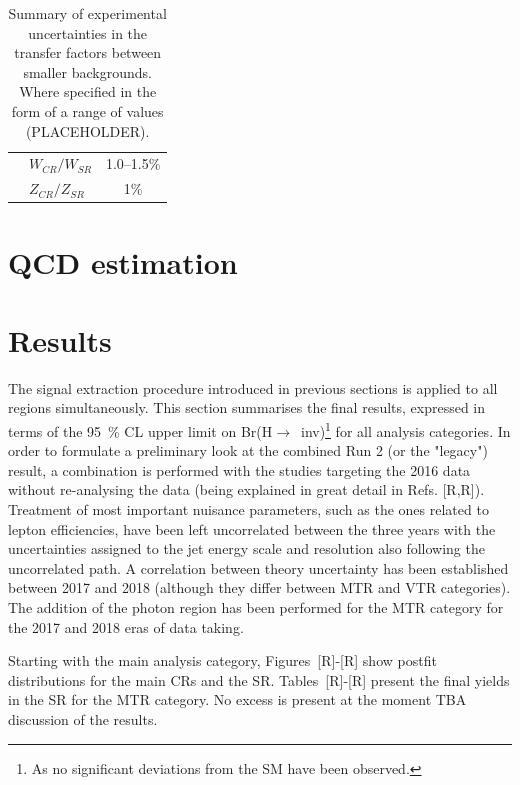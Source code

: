 \begin{table}[htbp]
\begin{center}
\begin{tabular}{llc}
                                & $W_{CR}/W_{SR}$               & 1.0--1.5\% \\
                                & $Z_{CR}/Z_{SR}$				& 1\% \\
       \hline
      \end{tabular}
    \end{center}
    \label{tab:systematics}
        \caption{Summary of experimental uncertainties in the transfer factors between smaller backgrounds. Where specified in the form of a range of values (PLACEHOLDER).}
\end{table}

\section{QCD estimation}


\newpage

\section{Results}

\hspace{10pt} The signal extraction procedure introduced in previous sections is applied to all regions simultaneously. This section summarises the final results, expressed in terms of the 95~\% CL upper limit on Br(H$\rightarrow$~inv)\footnote{As no significant deviations from the SM have been observed.} for all analysis categories. In order to formulate a preliminary look at the combined Run 2 (or the "legacy") result, a combination is performed with the studies targeting the 2016 data without re-analysing the data (being explained in great detail in Refs. [R,R]). Treatment of most important nuisance parameters, such as the ones related to lepton efficiencies, have been left uncorrelated between the three years with the uncertainties assigned to the jet energy scale and resolution also following the uncorrelated path. A correlation between theory uncertainty has been established between 2017 and 2018 (although they differ between MTR and VTR categories). The addition of the photon region has been performed for the MTR category for the 2017 and 2018 eras of data taking.

\hspace{10pt} Starting with the main analysis category, Figures~[R]-[R] show postfit distributions for the main CRs and the SR. Tables~[R]-[R] present the final yields in the SR for the MTR category. No excess is present at the moment TBA discussion of the results.

